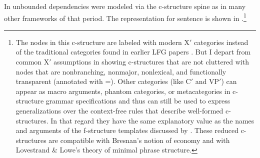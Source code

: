 \documentclass[output=paper,hidelinks]{langscibook}
\begin{document}
In \citet{kaplanbresnan82} unbounded dependencies were modeled via the c-structure spine as in many other frameworks of that period. The representation for sentence  is shown in .\footnote{The nodes in this c-structure are labeled with modern X$'$ categories instead of the traditional categories found in earlier LFG papers \citep[e.g.][]{kaplanbresnan82,kaplzaen89}.  But I depart from common X$'$ assumptions in showing c-structures that are not cluttered with nodes that are nonbranching, nonmajor, nonlexical, and functionally transparent (annotated with \UP=\DOWN).  Other categories (like C$'$ and VP$'$) can appear as macro arguments, phantom categories, or metacategories in c-structure grammar specifications \citep{kaplanmaxwell96,xledoc} and thus can still be used to express generalizations over the context-free rules that describe well-formed c-structures. In that regard they have the same explanatory value as the names and arguments of the f-structure templates discussed by \citet{dalrymple2004linguistic}. These reduced c-structures are compatible with Bresnan's \citeyearpar{bresnan2001lexical} notion of economy and with Lovestrand \& Lowe's \citeyearpar{lovestrand-lowe2017} theory of minimal phrase structure.}
\end{document}
